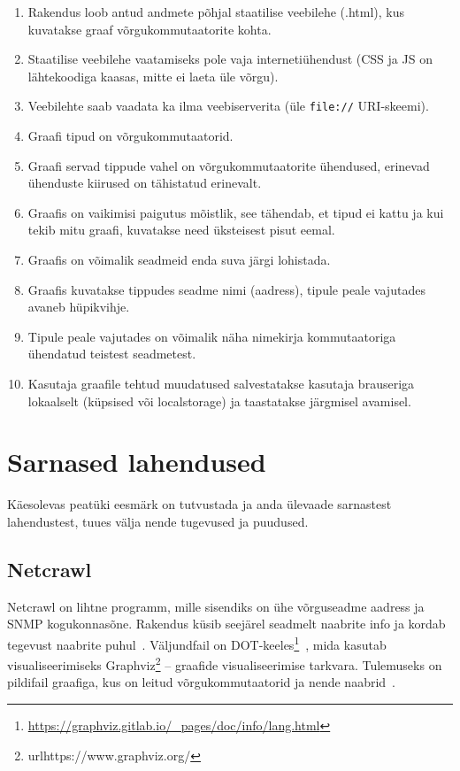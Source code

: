 \documentclass[12pt]{article}
\begin{document}
\begin{enumerate}
    \item Rakendus loob antud andmete põhjal staatilise veebilehe (.html), kus kuvatakse
    graaf võrgukommutaatorite kohta.
    \item Staatilise veebilehe vaatamiseks pole vaja internetiühendust (CSS ja JS on lähtekoodiga
    kaasas, mitte ei laeta üle võrgu).
    \item Veebilehte saab vaadata ka ilma veebiserverita (üle \texttt{file://} URI-skeemi).
    \item \label{itm:req:nodesSwitches} Graafi tipud on võrgukommutaatorid.
    \item \label{itm:req:edgesSwitchConnections} Graafi servad tippude vahel on võrgukommutaatorite
    ühendused, erinevad ühenduste kiirused on tähistatud erinevalt.
    \item \label{itm:req:graphLayout}Graafis on vaikimisi paigutus mõistlik, see tähendab, et tipud
    ei kattu ja kui tekib mitu graafi, kuvatakse need üksteisest pisut eemal.
    \item \label{itm:req:dragSwitches} Graafis on võimalik seadmeid enda suva järgi lohistada.
    \item \label{itm:req:popouts} Graafis kuvatakse tippudes seadme nimi (aadress), tipule peale
    vajutades avaneb hüpikvihje.
    \item \label{itm:req:popoutsOtherDevices}Tipule peale vajutades on võimalik näha nimekirja
    kommutaatoriga ühendatud teistest seadmetest.
    \item \label{itm:req:saveChanges} Kasutaja graafile tehtud muudatused salvestatakse
    kasutaja brauseriga lokaalselt (küpsised või localstorage) ja taastatakse järgmisel avamisel.
\end{enumerate}



\newpage
\section{Sarnased lahendused} \label{similar}

Käesolevas peatüki eesmärk on tutvustada ja anda ülevaade sarnastest lahendustest,
tuues välja nende tugevused ja puudused.

\subsection{Netcrawl}
Netcrawl on lihtne programm, mille sisendiks on ühe võrguseadme aadress ja SNMP kogukonnasõne.
Rakendus küsib seejärel seadmelt naabrite info ja kordab tegevust naabrite puhul~\cite{netcrawl}.
Väljundfail on DOT-keeles\footnote{\url{https://graphviz.gitlab.io/_pages/doc/info/lang.html}}~\cite{netcrawl},
mida kasutab visualiseerimiseks Graphviz\footnote{url{https://www.graphviz.org/}} -- graafide
visualiseerimise tarkvara.
Tulemuseks on pildifail graafiga, kus on leitud võrgukommutaatorid ja nende naabrid~\cite{netcrawl}.
\end{document}
